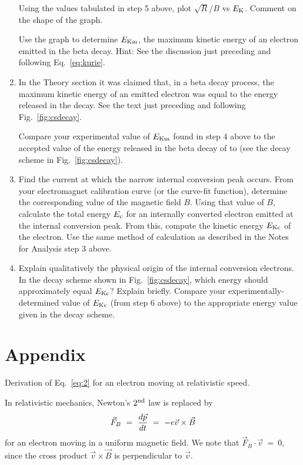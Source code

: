 \begin{enumerate}
Using the values tabulated in step 5 above, plot
$\sqrt{R}/B$ vs $E_{\rm K}$.  Comment on the shape of the
graph.

Use the graph to determine $E_{\rm Km}$, the maximum
kinetic energy of an electron emitted in the beta decay.
Hint:  See the discussion just preceding and following Eq.~\ref{eq:kurie}.

\item In the Theory section it was claimed that, in a beta decay
process, the maximum kinetic energy of an emitted electron was equal to
the energy released in the decay.  See the text just preceding and
following Fig.~\ref{fig:csdecay}.

Compare your experimental value of
$E_{\rm Km}$ found in step 4 above to the
accepted value of the energy released in the beta decay of \cs to
\bam (see the \cs decay scheme in Fig.~\ref{fig:csdecay}).

\item Find the current at which the narrow internal conversion
peak occurs.  From your electromagnet calibration curve (or the
curve-fit function), determine the corresponding value of the magnetic
field $B$.  Using that value of $B$, calculate the total energy
$E_{\rm c}$ for an internally converted
electron emitted at the internal conversion peak.  From this, compute
the kinetic energy $E_{\rm Kc}$ of the
electron.  Use the same method of calculation as described in the
Notes for Analysis step 3 above.

\item Explain qualitatively the physical origin of the internal
conversion electrons.  In the decay scheme shown in Fig.~\ref{fig:csdecay}, which
energy should approximately equal $E_{\rm Kc}$?
Explain briefly.  Compare your experimentally-determined value of
$E_{\rm Kc}$ (from step 6 above) to the
appropriate energy value given in the decay scheme.
\end{enumerate}

\section{Appendix}
Derivation of Eq.~\ref{eq:2} for an electron moving at
relativistic speed.

In relativistic mechanics, Newton's
$2^{\rm nd}$ law is replaced by
\begin{equation}
\vec{F}_B ~=~ {d\vec{p} \over dt} ~=~ -e \vec{v} \times \vec{B}
\end{equation}
for an electron
moving  in a uniform magnetic field. We note that $\vec{F}_B \cdot \vec{v} ~=~ 0$,
since the cross product $\vec{v} \times \vec{B}$
is perpendicular to $\vec{v}$.

